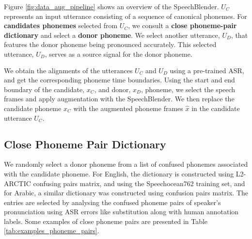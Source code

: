 \documentclass{INTERSPEECH2023}
\begin{document}
 
Figure \ref{fig:data_aug_pipeline} shows an overview of the SpeechBlender. $U_C$ represents an input utterance consisting of a sequence of canonical phonemes. For \textbf{candidates phonemes} selected from $U_C$,
we consult a \textbf{close phoneme-pair dictionary} and select a \textbf{donor phoneme}. We select another utterance, $U_D$, that features the donor phoneme being pronounced accurately. This selected utterance, $U_D$, serves as a source signal for the donor phoneme.

We obtain the alignments of the utterances $U_C$ and $U_D$ using a pre-trained ASR, and get the corresponding phoneme time boundaries. Using the start and end boundary of the candidate, $x_C$,  and donor, $x_D$, phoneme, we select the speech frames and apply augmentation with the SpeechBlender. We then replace the candidate phoneme $x_C$ with the augmented phoneme frames $\hat{x}$ in the candidate utterance $U_C$.


\subsection{Close Phoneme Pair Dictionary}
We randomly select a donor phoneme from a list of confused phonemes associated with the candidate phoneme. For English, the dictionary is constructed using L2-ARCTIC \cite{l2_arctic} confusing pairs matrix, and using the Speechocean762 \cite{speechocean} training set, and for Arabic, a similar dictionary was constructed using \cite{algabri2022mispronunciation} confusion pairs matrix. The entries are selected by analysing the confused phoneme pairs of speaker's pronunciation using ASR errors like substitution along with human annotation labels. Some examples of close phoneme pairs are presented in Table \ref{tab:examples_phoneme_pairs}.



\begin{table}[!ht]
\centering
{}
\caption{Examples of entries in Close Phoneme Pair Dictionary, with their \% of confusion.}
\label{tab:examples_phoneme_pairs}
\vspace{-0.6cm}
\end{table}
\end{document}
